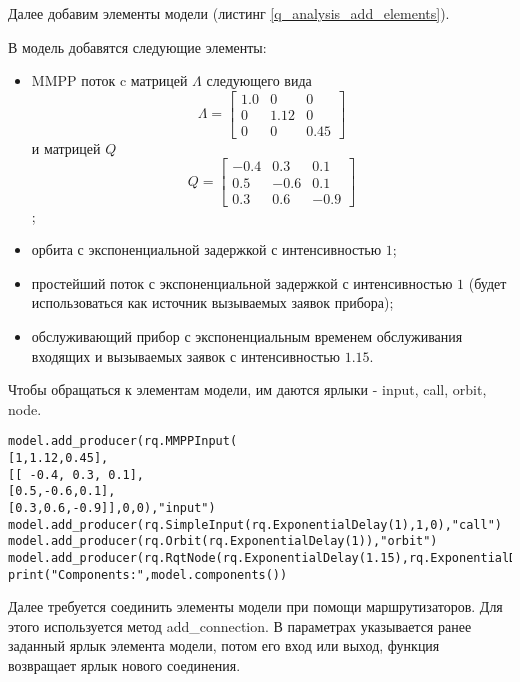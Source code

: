 Далее добавим элементы модели (листинг \ref{q_analysis_add_elements}). 

В модель добавятся следующие элементы: 
\begin{itemize}
	\item MMPP поток c матрицей $\Lambda$ следующего вида
		\begin{equation*}
			\Lambda =  \begin{bmatrix}
			1.0 & 0 &  0\\
			0 & 1.12 & 0\\
			0 & 0 &	0.45
			\end{bmatrix}
		\end{equation*} и матрицей $Q$
		\begin{equation*}
			Q =  \begin{bmatrix}
				-0.4 & 0.3 &  0.1\\
				0.5 & -0.6 & 0.1\\
				0.3 & 0.6 &	-0.9
			\end{bmatrix}
		\end{equation*};
	\item орбита с экспоненциальной задержкой с интенсивностью $1$;
	\item простейший поток с экспоненциальной задержкой с интенсивностью $1$ (будет использоваться как источник вызываемых заявок прибора);
	\item обслуживающий прибор с экспоненциальным временем обслуживания входящих и вызываемых заявок с интенсивностью $1.15$.
\end{itemize}
Чтобы обращаться к элементам модели, им даются ярлыки - input, call, orbit, node.


\begin{lstlisting}
model.add_producer(rq.MMPPInput(
[1,1.12,0.45],
[[ -0.4, 0.3, 0.1],
[0.5,-0.6,0.1],
[0.3,0.6,-0.9]],0,0),"input")
model.add_producer(rq.SimpleInput(rq.ExponentialDelay(1),1,0),"call")
model.add_producer(rq.Orbit(rq.ExponentialDelay(1)),"orbit")
model.add_producer(rq.RqtNode(rq.ExponentialDelay(1.15),rq.ExponentialDelay(1.15)),"node")
print("Components:",model.components())
\end{lstlisting}


Далее требуется соединить элементы модели при помощи маршрутизаторов. Для этого используется метод add\_connection. В параметрах указывается ранее заданный ярлык элемента модели, потом его вход или выход, функция возвращает ярлык нового соединения.

